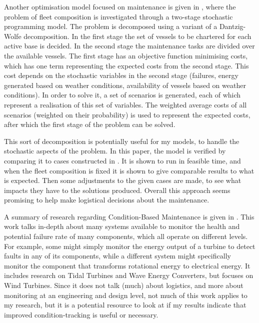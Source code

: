 \documentclass[a4paper,12pt]{article}
\begin{document}
Another optimisation model focused on maintenance is given in \cite{staalhane2019optimizing}, where the problem of fleet composition is investigated through a two-stage stochastic programming model. The problem is decomposed using a variant of a Dantzig-Wolfe decomposition. In the first stage the set of vessels to be chartered for each active base is decided. In the second stage the maintenance tasks are divided over the available vessels. The first stage has an objective function minimising costs, which has one term representing the expected costs from the second stage. This cost depends on the stochastic variables in the second stage (failures, energy generated based on weather conditions, availability of vessels based on weather conditions). In order to solve it, a set of scenarios is generated, each of which represent a realisation of this set of variables. The weighted average costs of all scenarios (weighted on their probability) is used to represent the expected costs, after which the first stage of the problem can be solved. 

This sort of decomposition is potentially useful for my models, to handle the stochastic aspects of the problem. In this paper, the model is verified by comparing it to cases constructed in \cite{dinwoodie2015reference}. It is shown to run in feasible time, and when the fleet composition is fixed it is shown to give comparable results to what is expected. Then some adjustments to the given cases are made, to see what impacts they have to the solutions produced. Overall this approach seems promising to help make logistical decisions about the maintenance. 

\bigskip

A summary of research regarding Condition-Based Maintenance is given in \cite{merigaud2016condition}. This work talks in-depth about many systems available to monitor the health and potential failure rate of many components, which all operate on different levels. For example, some might simply monitor the energy output of a turbine to detect faults in any of its components, while a different system might specifically monitor the component that transforms rotational energy to electrical energy. It includes research on Tidal Turbines and Wave Energy Converters, but focuses on Wind Turbines. Since it does not talk (much) about logistics, and more about monitoring at an engineering and design level, not much of this work applies to my research, but it is a potential resource to look at if my results indicate that improved condition-tracking is useful or necessary. 
\end{document}
